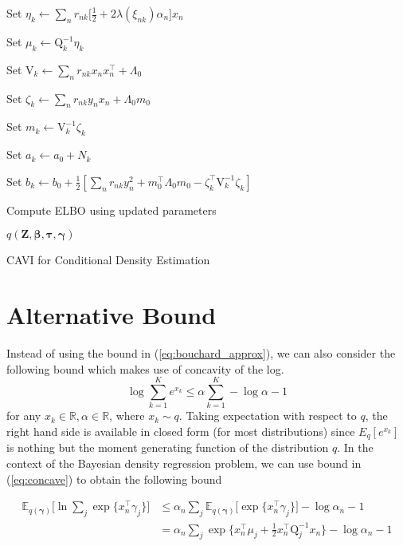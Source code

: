 \documentclass[twoside,11pt]{article}
\newcommand{\transpose}[1]{#1^{\intercal}}
\newcommand{\R}{\mathbb{R}}
\newcommand{\nsum}{\sum_{n}}
\newcommand{\boldbeta}{\boldsymbol\beta}
\newcommand{\boldgamma}{\boldsymbol\gamma}
\newcommand{\boldtau}{\boldsymbol\tau}
\newcommand{\E}{\mathbb{E}}
\begin{document}
\begin{algorithm}[H]
{{   Set $\eta_k \leftarrow \sum_{n} r_{nk} \big[ \frac{1}{2} + 2\lambda(\xi_{nk}) \alpha_n \big]x_n$\; %
         
   Set $\mu_k \leftarrow \mathrm{Q}_k^{-1} \eta_k$\; %
   
   Set $\mathrm{V}_k \leftarrow \nsum r_{nk} x_n \transpose{x_n} + \Lambda_0$ \; %
   
   Set $\zeta_k \leftarrow \sum_{n} r_{nk} y_n x_n + \Lambda_0 m_0$\; %
   
   Set $m_k \leftarrow \mathrm{V}_k^{-1} \zeta_k$\; %
   
   Set $a_k \leftarrow a_0 + N_k$\; %
   
   Set $b_k \leftarrow b_0 + \frac{1}{2}[\nsum r_{nk} y_n^2 + \transpose{m_0}\Lambda_0 m_0 - \transpose{\zeta_k} \mathrm{V}_k^{-1} \zeta_k]$\; %
   }
   Compute ELBO using updated parameters
 } %
 \Return $q \left( \mathbf{Z}, \boldbeta, \boldtau, \boldgamma \right)$
 \caption{CAVI for Conditional Density Estimation}
\end{algorithm}



\section{Alternative Bound} \label{sec:alt}
Instead of using the bound in (\ref{eq:bouchard_approx}), we can also consider the following bound which makes use of concavity of the log.
\begin{equation} \label{eq:concave}
	\log \sum_{k=1}^{K} e^{x_k} \leq \alpha \sum_{k=1}^{K} - \log \alpha - 1
\end{equation}
for any $x_k \in \R, \alpha \in \R$, where $x_k \sim q$. Taking expectation with respect to $q$, the right hand side is available in closed form (for most distributions) since $E_{q}[e^{x_k}]$ is nothing but the moment generating function of the distribution $q$. In the context of the Bayesian density regression problem, we can use bound in (\ref{eq:concave}) to obtain the following bound

\begin{equation} \label{eq:alt_bound}
\begin{split}
	 \E_{q(\boldgamma)} \Big[ \ln \sum_{j} \exp \{ \transpose{x_n} \gamma_j \} \Big] & \leq \alpha_n 
	 \sum_{j} \E_{q(\boldgamma)} \Big[ \exp \{ \transpose{x_n} \gamma_j \} \Big] - \log \alpha_n - 1 \\
	 &= \alpha_n \sum_{j} \exp\Big\{ \transpose{x_n} \mu_j + \frac{1}{2} \transpose{x_n}\mathrm{Q}_j^{-1} x_n \Big\} - \log \alpha_n - 1
\end{split}
\end{equation}
\end{document}
